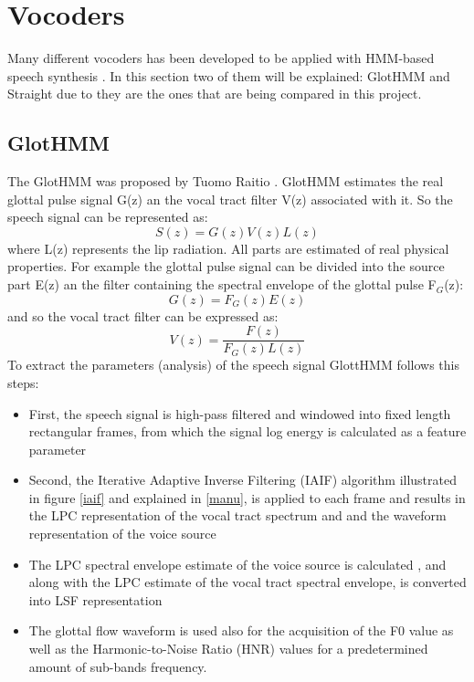 \section{Vocoders}\label{voco-a-s}
Many different vocoders has been developed to be applied with HMM-based speech synthesis \cite{manu}. In this section two of them will be explained: GlotHMM and Straight due to they are the ones that are being compared in this project.
\subsection{GlotHMM}\label{glotthmmvoco}
The GlotHMM was proposed by Tuomo Raitio \cite{tuomo}. GlotHMM estimates the real glottal pulse signal G(z) an the vocal tract filter V(z) associated with it. So the speech signal can be represented as:
\begin{equation}
	S(z) = G(z)V(z)L(z) 
\end{equation}
where L(z) represents the lip radiation. All parts are estimated of real physical properties. For example the glottal pulse signal can be divided into the source part E(z) an the filter containing the spectral envelope of the glottal pulse F$_{G}$(z):
\begin{equation}
	G(z) = F_{G}(z)E(z)
\end{equation}
and so the vocal tract filter can be expressed as:
\begin{equation}
	V(z) = \dfrac{F(z)}{F_{G}(z)L(z)} 
\end{equation} %
To extract the parameters (analysis) of the speech signal GlottHMM follows this steps:
\begin{itemize}
	\item First, the speech signal is high-pass filtered and windowed into fixed length rectangular frames, from which the signal log energy is calculated as a feature parameter
	\item Second, the Iterative Adaptive Inverse Filtering (IAIF) algorithm illustrated in figure \ref{iaif} and explained in \ref{manu}, is applied to each frame and results in the LPC representation of the vocal tract spectrum and and the waveform representation of the voice source
	\item The LPC spectral envelope estimate of the voice source is calculated , and along with the LPC estimate of the vocal tract spectral envelope, is converted into LSF representation
	\item The glottal flow waveform is used also for the acquisition of the F0 value as well as the Harmonic-to-Noise Ratio (HNR) values for a predetermined amount of sub-bands frequency. 
\end{itemize}
